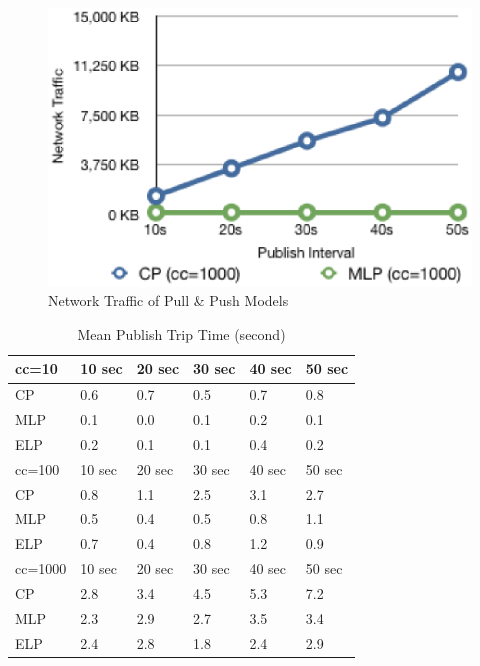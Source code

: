 \begin{figure}[htb!]
\centering%
    \includegraphics[scale=0.70]{figures/io.eps}
    \caption{Network Traffic of Pull \& Push Models}
    \label{fig:traffic}
\end{figure}


\begin{table}
\centering \caption{\label{tb:mpt_all} Mean Publish Trip Time (second)}
\begin{tabular}{|l|l|l|l|l|l|}
    \hline cc=10 & 10 sec & 20 sec & 30 sec & 40 sec & 50 sec \\
    \hline CP & 0.6 & 0.7 & 0.5 & 0.7 & 0.8 \\
    \hline MLP & 0.1 & 0.0 & 0.1 & 0.2 & 0.1 \\
    \hline ELP & 0.2 & 0.1 & 0.1 & 0.4 & 0.2 \\
    \hline
    \hline cc=100 & 10 sec & 20 sec & 30 sec & 40 sec & 50 sec \\
    \hline CP & 0.8 & 1.1 & 2.5 & 3.1 & 2.7 \\
    \hline MLP & 0.5 & 0.4 & 0.5 & 0.8 & 1.1 \\
    \hline ELP & 0.7 & 0.4 & 0.8 & 1.2 & 0.9 \\
    \hline
    \hline cc=1000& 10 sec & 20 sec & 30 sec & 40 sec & 50 sec \\
    \hline CP & 2.8 & 3.4 & 4.5 & 5.3 & 7.2 \\
    \hline MLP & 2.3 & 2.9 & 2.7 & 3.5 & 3.4 \\
    \hline ELP & 2.4 & 2.8 & 1.8 & 2.4 & 2.9 \\
    \hline
\end{tabular}
\end{table}

